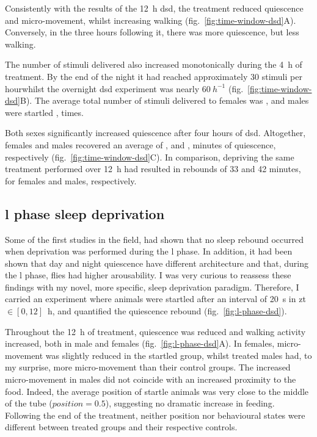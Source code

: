Consistently with the results of the 12~h \gls{dsd}, the treatment reduced quiescence and micro-movement, whilst increasing walking (fig.~\ref{fig:time-window-dsd}A).
Conversely, in the three hours following it, there was more quiescence, but less walking. 

The number of stimuli delivered also increased monotonically during the 4~h of treatment.
By the end of the night it had reached approximately 30 stimuli per hour\emd{}whilst the overnight \gls{dsd} experiment was nearly $60~h^{-1}$ (fig.~\ref{fig:time-window-dsd}B).
The average total number of stimuli delivered to females was 
, and males were startled
, times.

Both sexes significantly increased quiescence after four hours of \gls{dsd}.
Altogether, females and males recovered an average of 
, and
, minutes of quiescence, respectively
(fig.~\ref{fig:time-window-dsd}C).
In comparison, depriving the same treatment performed over 12~h had resulted in rebounds of 33 and 42 minutes, for females and males, respectively.


\subsection{\acrlong{l} phase sleep deprivation}
Some of the first studies in the field, had shown that no sleep rebound occurred when deprivation was performed during the \gls{l} phase\cite{hendricks_rest_2000,huber_sleep_2004}.
In addition, it had been shown that day and night quiescence have different architecture and that, during the \gls{l} phase, flies had higher arousability\cite{huber_sleep_2004,faville_how_2015}.
I was very curious to reassess these findings with my novel, more specific, sleep deprivation paradigm.
Therefore, I carried an experiment where animals were startled after an interval of 20~s in \gls{zt}~$\in [0,12]$~h,
and quantified the quiescence rebound (fig.~\ref{fig:l-phase-dsd}).


Throughout the 12~h of treatment, quiescence was reduced and walking activity increased, both in male and females (fig.~\ref{fig:l-phase-dsd}A).
In females, micro-movement was slightly reduced in the startled group, whilst treated males had, to my surprise, more micro-movement than their control groups.
The increased micro-movement in males did not coincide with an increased proximity to the food. 
Indeed, the average position of startle animals was very close to the middle of the tube ($position = 0.5$), suggesting no dramatic increase in feeding.
Following the end of the treatment, neither position nor behavioural states were different between treated groups and their respective controls.

